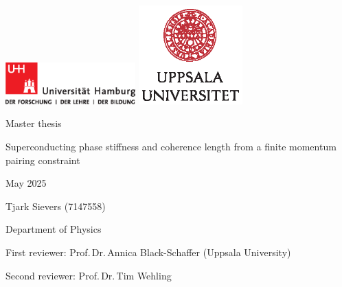 \documentclass[main.tex]{subfiles}
\begin{document}
\begin{fullsizetitle}
    \vspace{2cm}
    \hspace{0.1\textwidth}
    \vline\hspace{10pt}
    \begin{minipage}[t][0.8\textheight][t]{0.8\textwidth}
        \includegraphics[width=5cm, valign=c]{images/logos/up-uhh-logo-u-2010-u-farbe-u-cmyk}
        \includegraphics[width=4cm, valign=c]{images/logos/UU_logo_CMYK}\par
        \vspace{1\baselineskip}

    \begin{FlushLeft}
        {\Large\textcolor{UHHred}{Master thesis}\par}

        {\huge Superconducting phase stiffness and coherence length from a finite momentum pairing constraint\par}

       \vspace{1\baselineskip}
       
       May 2025

    \end{FlushLeft}

    \vfill
    
    \begin{FlushLeft}
    	Tjark Sievers (7147558)\par
        Department of Physics\par
        First reviewer: Prof.\,Dr.\,Annica Black-Schaffer (Uppsala University) \par
        Second reviewer: Prof.\,Dr.\,Tim Wehling \par
    \end{FlushLeft}
    \end{minipage}
\end{fullsizetitle}
\end{document}
